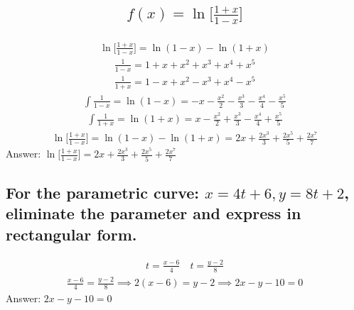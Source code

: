 \documentclass{article}
\begin{document}
\subsection{
	\begin{align*}
		f(x) = \ln{\bigg[ \frac{1 + x}{1 - x} \bigg]}
	\end{align*}
}
\begin{align*}
	\ln{\bigg[ \frac{1 + x}{1 - x} \bigg]} = \ln{(1 - x)} - \ln{(1 + x)}
\end{align*}
\begin{align*}
	\frac{1}{1 - x} = 1 + x + x^2 + x^3 + x^4 +x^5
\end{align*}
\begin{align*}
	\frac{1}{1 + x} = 1 - x + x^2 - x^3 + x^4 - x^5
\end{align*}
\begin{align*}
	\int{\frac{1}{1 - x}} = \ln{(1 - x)} = -x - \frac{x^2}{2} - \frac{x^3}{3} - \frac{x^4}{4} - \frac{x^5}{5}
\end{align*}
\begin{align*}
	\int{\frac{1}{1 + x}} = \ln{(1 + x)} = x - \frac{x^2}{2} + \frac{x^3}{3} - \frac{x^4}{4} + \frac{x^5}{5}
\end{align*}
\begin{align*}
	\ln{\bigg[ \frac{1 + x}{1 - x} \bigg]} = \ln{(1 - x)} - \ln{(1 + x)} = 2x + \frac{2x^3}{3} + \frac{2x^5}{5} + \frac{2x^7}{7}
\end{align*}
Answer: $\ln{\bigg[ \frac{1 + x}{1 - x} \bigg]} = 2x + \frac{2x^3}{3} + \frac{2x^5}{5} + \frac{2x^7}{7}$

\subsection{For the parametric curve: $x = 4t + 6, y = 8t + 2$, eliminate the parameter and express in rectangular form.}
\begin{align*}
	t = \frac{x - 6}{4} \quad t = \frac{y - 2}{8}
\end{align*}
\begin{align*}
	\frac{x - 6}{4} = \frac{y - 2}{8} \implies 2(x - 6) = y - 2 \implies 2x - y - 10 = 0
\end{align*}
Answer: $2x - y - 10 = 0$

\end{document}
